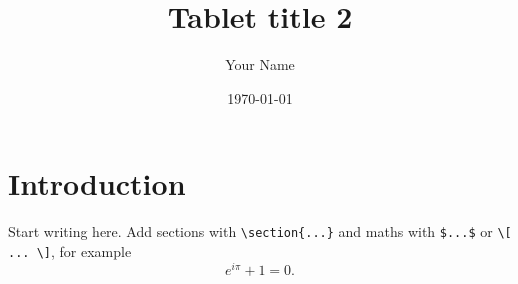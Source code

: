 \documentclass[11pt,a4paper]{article}
\title{Tablet title 2}
\author{Your Name}
\date{\today}
\begin{document}
\maketitle

\section{Introduction}
Start writing here. Add sections with \verb|\section{...}| and maths with \verb|$...$| or
\verb|\[ ... \]|, for example
\[ e^{i\pi} + 1 = 0. \]
\end{document}
